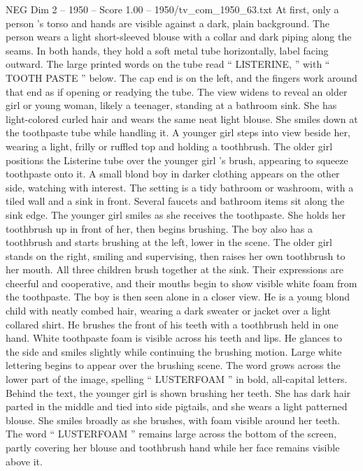 \begin{textsample}{NEG Dim 2 – 1950 – Score 1.00 – 1950/tv\_com\_1950\_63.txt}  \label{ex:f2_neg_016}
At first, only a person ’s torso and hands are visible against a dark, plain background.
The person wears a light short-sleeved blouse with a collar and dark piping along the seams.
In both hands, they hold a soft metal tube horizontally, label facing outward.
The large printed words on the tube read “ LISTERINE, ” with “ TOOTH PASTE ” below.
The cap end is on the left, and the fingers work around that end as if opening or readying the tube.
The view widens to reveal an older girl or young woman, likely a teenager, standing at a bathroom sink.
She has light-colored curled hair and wears the same neat light blouse.
She smiles down at the toothpaste tube while handling it.
A younger girl steps into view beside her, wearing a light, frilly or ruffled top and holding a toothbrush.
The older girl positions the Listerine tube over the younger girl ’s brush, appearing to squeeze toothpaste onto it.
A small blond boy in darker clothing appears on the other side, watching with interest.
The setting is a tidy bathroom or washroom, with a tiled wall and a sink in front.
Several faucets and bathroom items sit along the sink edge.
The younger girl smiles as she receives the toothpaste.
She holds her toothbrush up in front of her, then begins brushing.
The boy also has a toothbrush and starts brushing at the left, lower in the scene.
The older girl stands on the right, smiling and supervising, then raises her own toothbrush to her mouth.
All three children brush together at the sink.
Their expressions are cheerful and cooperative, and their mouths begin to show visible white foam from the toothpaste.
The boy is then seen alone in a closer view.
He is a young blond child with neatly combed hair, wearing a dark sweater or jacket over a light collared shirt.
He brushes the front of his teeth with a toothbrush held in one hand.
White toothpaste foam is visible across his teeth and lips.
He glances to the side and smiles slightly while continuing the brushing motion.
Large white lettering begins to appear over the brushing scene.
The word grows across the lower part of the image, spelling “ LUSTERFOAM ” in bold, all-capital letters.
Behind the text, the younger girl is shown brushing her teeth.
She has dark hair parted in the middle and tied into side pigtails, and she wears a light patterned blouse.
She smiles broadly as she brushes, with foam visible around her teeth.
The word “ LUSTERFOAM ” remains large across the bottom of the screen, partly covering her blouse and toothbrush hand while her face remains visible above it.

\end{textsample}
